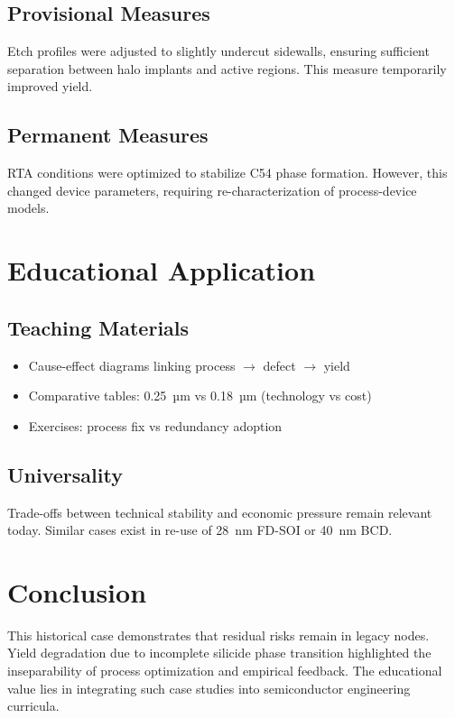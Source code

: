 \documentclass[conference]{IEEEtran}
\begin{document}
\subsection{Provisional Measures}
Etch profiles were adjusted to slightly undercut sidewalls, ensuring sufficient separation between halo implants and active regions. 
This measure temporarily improved yield.

\subsection{Permanent Measures}
RTA conditions were optimized to stabilize C54 phase formation. 
However, this changed device parameters, requiring re-characterization of process-device models.

\section{Educational Application}
\subsection{Teaching Materials}
\begin{itemize}
    \item Cause-effect diagrams linking process $\rightarrow$ defect $\rightarrow$ yield
    \item Comparative tables: 0.25~µm vs 0.18~µm (technology vs cost)
    \item Exercises: process fix vs redundancy adoption
\end{itemize}

\subsection{Universality}
Trade-offs between technical stability and economic pressure remain relevant today. 
Similar cases exist in re-use of 28~nm FD-SOI or 40~nm BCD.

\section{Conclusion}
This historical case demonstrates that residual risks remain in legacy nodes. 
Yield degradation due to incomplete silicide phase transition highlighted the inseparability of process optimization and empirical feedback. 
The educational value lies in integrating such case studies into semiconductor engineering curricula.
\end{document}
